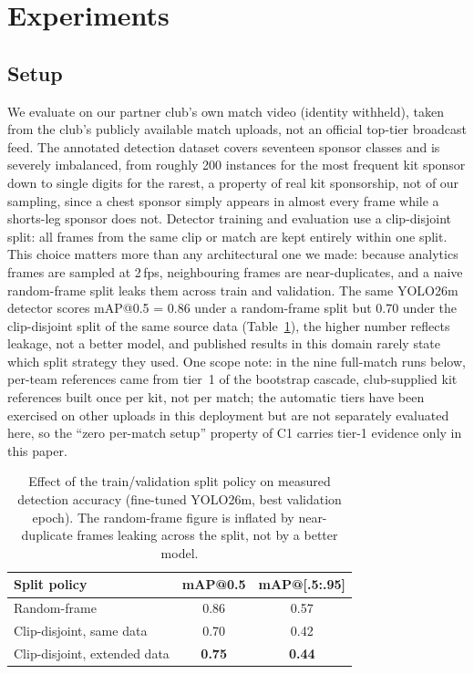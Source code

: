 \documentclass[conference,a4paper]{IEEEtran}
\begin{document}
\section{Experiments}
\label{sec:exp}

\subsection{Setup}
We evaluate on our partner club's own match video (identity withheld), taken from the
club's publicly available match uploads, not an official top-tier broadcast feed. The
annotated detection dataset covers seventeen sponsor classes and is severely
imbalanced, from roughly 200 instances for the most frequent kit sponsor down to
single digits for the rarest, a property of real kit sponsorship, not of our
sampling, since a chest sponsor simply appears in almost every frame while a
shorts-leg sponsor does not. Detector
training and evaluation use a clip-disjoint split: all frames from the same clip or
match are kept entirely within one split. This choice matters more than any
architectural one we made: because analytics frames are sampled at 2\,fps,
neighbouring frames are near-duplicates, and a naive random-frame split leaks them
across train and validation. The same YOLO26m detector scores mAP@0.5 = 0.86 under a
random-frame split but 0.70 under the clip-disjoint split of the same source data
(Table~\ref{tab:split}),
the higher number reflects leakage, not a better model, and published results in this
domain rarely state which split strategy they used. One scope note: in the nine
full-match runs below, per-team references came from tier~1 of the bootstrap cascade, club-supplied
kit references built once per kit, not per match; the automatic tiers have been
exercised on other uploads in this deployment but are not separately evaluated here,
so the ``zero per-match setup'' property of C1 carries tier-1 evidence only in this
paper.

\begin{table}[t]
\centering
\caption{Effect of the train/validation split policy on measured detection accuracy
(fine-tuned YOLO26m, best validation epoch). The random-frame figure is inflated by
near-duplicate frames leaking across the split, not by a better model.}
\label{tab:split}
\begin{tabular}{lcc}
\toprule
Split policy & mAP@0.5 & mAP@[.5:.95] \\
\midrule
Random-frame                  & 0.86 & 0.57 \\
Clip-disjoint, same data      & 0.70 & 0.42 \\
Clip-disjoint, extended data  & \textbf{0.75} & \textbf{0.44} \\
\bottomrule
\end{tabular}
\end{table}
\end{document}
